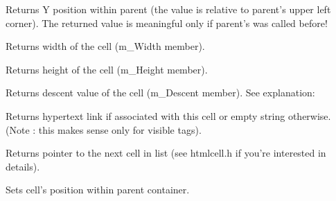 \label{wxhtmlcellgetposy}


Returns Y position within parent (the value is relative to parent's
upper left corner). The returned value is meaningful only if 
parent's  was called before!

\label{wxhtmlcellgetwidth}


Returns width of the cell (m_Width member).

\label{wxhtmlcellgetheight}


Returns height of the cell (m_Height member).

\label{wxhtmlcellgetdescent}


Returns descent value of the cell (m_Descent member). See explanation:


\label{wxhtmlcellgetlink}


Returns hypertext link if associated with this cell or empty string otherwise.
(Note : this makes sense only for visible tags). 



\label{wxhtmlcellgetnext}


Returns pointer to the next cell in list (see htmlcell.h if you're
interested in details).

\label{wxhtmlcellsetpos}


Sets cell's position within parent container.


